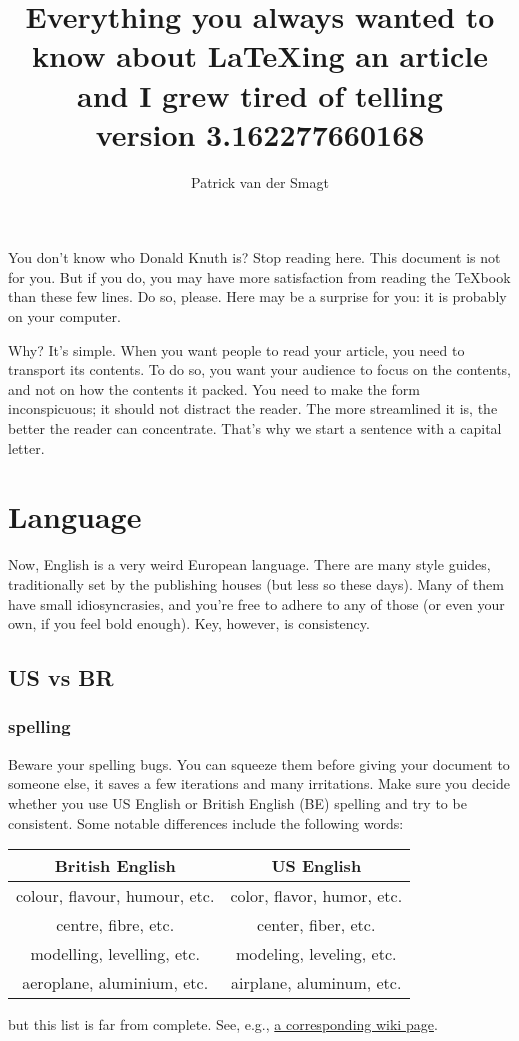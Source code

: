 \documentclass{article}
\title{Everything you always wanted to know about \LaTeX ing an article 
and I grew tired of telling\\[1ex]
\footnotesize{version 3.162277660168}}
\author{Patrick van der Smagt}
\begin{document}
\maketitle

You don't know who Donald Knuth is?  Stop reading here.  This document is 
not for you.  But if you do, you may have more satisfaction from reading 
the \TeX book than these few lines.   Do so, please. Here may be a surprise for you: it is probably on your computer.

Why?
It's simple.
When you want people to read your article, you need to transport its contents. 
To do so, you want your audience to focus on the contents, and not on how the contents it packed.
You need to make the form inconspicuous; it should not distract the reader.
The more streamlined it is, the better the reader can concentrate.
That's why we start a sentence with a capital letter.



\section{Language}
Now, English is a very weird European language.
There are many style guides, traditionally set by the publishing houses (but less so these days).
Many of them have small idiosyncrasies, and you're free to adhere to any of those (or even your own, if you feel bold enough).
Key, however, is consistency.

\subsection{US vs BR}
\subsubsection{spelling}

Beware your spelling bugs.  You can squeeze them before giving your document to someone else, it saves a few iterations and many irritations.  Make sure you decide whether you use US English or British English (BE) spelling and try to be consistent.
Some notable differences include the following words:
\begin{center}\begin{tabular}{c|c}
British English & US English \\\hline
colour, flavour, humour, etc.	& color, flavor, humor, etc.\\
centre, fibre, etc.	& center, fiber, etc.\\
modelling, levelling, etc.		& modeling, leveling, etc.\\
aeroplane, aluminium, etc.			& airplane, aluminum, etc.
\end{tabular}\end{center}
but this list is far from complete.  See, e.g., \href{http://en.wikipedia.org/wiki/American_and_British_English_spelling_differences}{a corresponding wiki page}.
\end{document}
